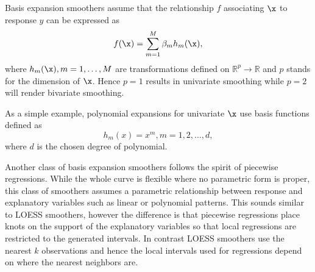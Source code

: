 Basis expansion smoothers assume that the relationship $f$ associating $\x$ to response $y$ can be expressed as
\begin{equation} \label{mod:basexp}
f(\x) =\sum_{m=1}^{M}\beta_mh_m(\x),
\end{equation} 
where $h_m(\x), m=1,\dots,M$ are transformations defined on $\mathbb{R}^p\rightarrow \mathbb{R}$ and $p$ stands for the dimension of $\x$. Hence $p=1$ results in univariate smoothing while $p=2$ will render bivariate smoothing. 

As a simple example, polynomial expansions for univariate $\x$ use basis functions defined as 
\begin{equation} \label{mod:polybas}
h_m(x)=x^m, m=1,2,\dots,d,
\end{equation} 
where $d$ is the chosen degree of polynomial. %

Another class of basis expansion smoothers follows the spirit of piecewise regressions. While the whole curve is flexible where no parametric form is proper, this class of smoothers assumes a parametric relationship between response and explanatory variables such as linear or polynomial patterns. This sounds similar to LOESS smoothers, however the difference is that piecewise regressions place knots on the support of the explanatory variables so that local regressions are restricted to the generated intervals. In contrast LOESS smoothers use the nearest $k$ observations and hence the local intervals used for regressions depend on where the nearest neighbors are. 

